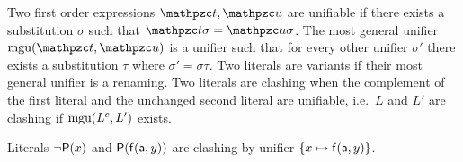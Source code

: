 
\begin{definition}\label{def:unifier}
Two first order expressions $\mct, \mcu$ are {\myem unifiable} if there exists a substitution $\sigma$ such that $\mct\sigma=\mcu\sigma$.
The {\myem most general unifier} $\mgu(\mct,\mcu)$ is a unifier such that
for every other unifier $\sigma'$ there exists a substitution $\tau$ where
$\sigma' = \sigma \tau$. 
Two literals are variants if their most general unifier is a renaming.
Two literals are {\myem clashing} when the complement of the first literal 
and the unchanged second literal are unifiable, i.e.~$L$ and $L'$ are clashing if $\operatorname{mgu}(L^c, L')$ exists.
\end{definition}

\begin{example}
	Literals $\lnot{\mathsf P}(x)$ and ${\mathsf P}({\mathsf f}({\mathsf a},y))$ 
	are clashing by unifier $\{ x\mapsto {\mathsf f}({\mathsf a},y)\}$.
\end{example}